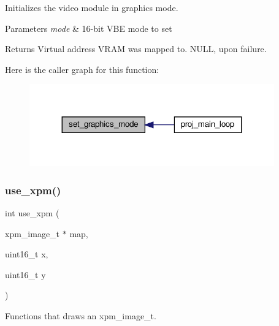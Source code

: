 Initializes the video module in graphics mode. 


\begin{DoxyParams}{Parameters}
{\em mode} & 16-\/bit V\+BE mode to set \\
\hline
\end{DoxyParams}
\begin{DoxyReturn}{Returns}
Virtual address V\+R\+AM was mapped to. N\+U\+LL, upon failure. 
\end{DoxyReturn}
Here is the caller graph for this function\+:\nopagebreak
\begin{figure}[H]
\begin{center}
\leavevmode
\includegraphics[width=299pt]{group__video__card_ga430711ee8dd8b9944c9393b6f333f48d_icgraph}
\end{center}
\end{figure}
\mbox{\label{group__video__card_gacfacfc0ba6b20cfe99f211e93870bc4c}} 
\subsubsection{\texorpdfstring{use\+\_\+xpm()}{use\_xpm()}}
{\footnotesize\ttfamily int use\+\_\+xpm (\begin{DoxyParamCaption}\item[{xpm\+\_\+image\+\_\+t $\ast$}]{map,  }\item[{uint16\+\_\+t}]{x,  }\item[{uint16\+\_\+t}]{y }\end{DoxyParamCaption})}



Functions that draws an xpm\+\_\+image\+\_\+t. 



